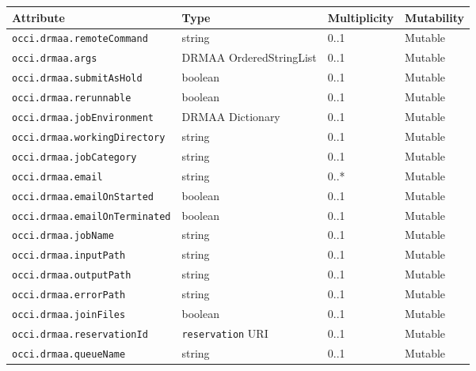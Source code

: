 \documentclass[10pt]{article}
\newcommand{\h}[1]{\lstinline|#1|}
\begin{document}
\begin{table}[ht]
\centering
\begin{tabularx}{\textwidth}{|l|X|l|l|}
\hline 
Attribute           & Type                         & Multiplicity & Mutability \\
\hline
\h{occi.drmaa.remoteCommand}       & string                       & 0..1         & Mutable   \\ 
\h{occi.drmaa.args}                & DRMAA OrderedStringList      & 0..1         & Mutable   \\
\h{occi.drmaa.submitAsHold}        & boolean                      & 0..1         & Mutable   \\
\h{occi.drmaa.rerunnable}          & boolean                      & 0..1         & Mutable   \\
\h{occi.drmaa.jobEnvironment}      & DRMAA Dictionary             & 0..1         & Mutable   \\
\h{occi.drmaa.workingDirectory}    & string                       & 0..1         & Mutable   \\
\h{occi.drmaa.jobCategory}         & string                       & 0..1         & Mutable   \\
\h{occi.drmaa.email}               & string                       & 0..*         & Mutable   \\
\h{occi.drmaa.emailOnStarted}      & boolean                      & 0..1         & Mutable   \\
\h{occi.drmaa.emailOnTerminated}   & boolean                      & 0..1         & Mutable   \\ 
\h{occi.drmaa.jobName}             & string                       & 0..1         & Mutable   \\
\h{occi.drmaa.inputPath}           & string                       & 0..1         & Mutable   \\
\h{occi.drmaa.outputPath}          & string                       & 0..1         & Mutable   \\
\h{occi.drmaa.errorPath}           & string                       & 0..1         & Mutable   \\
\h{occi.drmaa.joinFiles}           & boolean                      & 0..1         & Mutable   \\
\h{occi.drmaa.reservationId}       & \h{reservation} URI          & 0..1         & Mutable   \\
\h{occi.drmaa.queueName}           & string                       & 0..1         & Mutable   \\

\end{tabularx}
\end{table}
\end{document}
